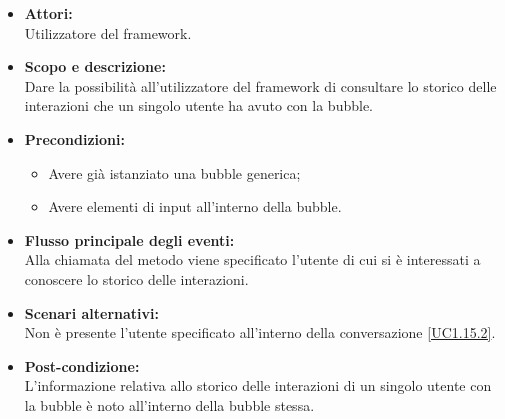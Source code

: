 \begin{itemize}
	\item \textbf{Attori:}
	\\Utilizzatore del framework.
	\item \textbf{Scopo e descrizione:} 
	\\Dare la possibilità all'utilizzatore del framework di consultare lo storico delle interazioni che un singolo utente ha avuto con la bubble.
	\item \textbf{Precondizioni:}
	\begin{itemize}
		\item Avere già istanziato una bubble generica;
		\item Avere elementi di input all'interno della bubble.
	\end{itemize}
	\item \textbf{Flusso principale degli eventi:}
	\\Alla chiamata del metodo viene specificato l'utente di cui si è interessati a conoscere lo storico delle interazioni.
	\item \textbf{Scenari alternativi:}
	\\Non è presente l'utente specificato all'interno della conversazione \ref{UC1.15.2}.
	\item \textbf{Post-condizione:}
	\\L'informazione relativa allo storico delle interazioni di un singolo utente con la bubble è noto all'interno della bubble stessa.
\end{itemize}


